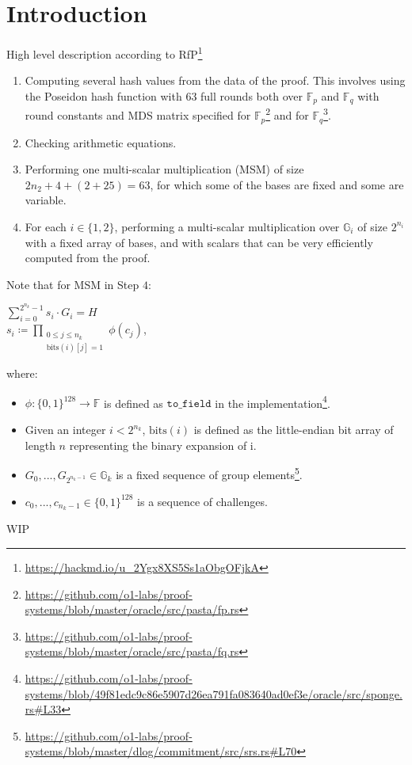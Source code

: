 \section{Introduction}
\label{section:introduction}

High level description according to RfP\footnote{\url{https://hackmd.io/u_2Ygx8XS5Ss1aObgOFjkA}}
\begin{enumerate}
	\item Computing several hash values from the data of the proof. 
This involves using the Poseidon hash function with 63 full rounds both over $\mathbb{F}_p$ and $\mathbb{F}_q$ 
with round constants and MDS matrix specified for $\mathbb{F}_p$\footnote{\url{https://github.com/o1-labs/proof-systems/blob/master/oracle/src/pasta/fp.rs}} 
and for $\mathbb{F}_q$\footnote{\url{https://github.com/o1-labs/proof-systems/blob/master/oracle/src/pasta/fq.rs}}.
	\item Checking arithmetic equations.
	\item Performing one multi-scalar multiplication (MSM) of size $2n_2 + 4 + (2 + 25) = 63$,
for which some of the bases are fixed and some are variable.
	\item For each $i \in \{1, 2\}$, performing a multi-scalar multiplication over $\mathbb{G}_i$ of size $2^{n_i}$
with a fixed array of bases, and with scalars that can be very efficiently computed from the proof.
\end{enumerate}

Note that for MSM in Step $4$:
\begin{center}
	$\sum\limits_{i = 0}^{2^{n_k} - 1}s_i \cdot G_i = H$ \\
	$s_i \coloneqq \prod\limits_{\substack{0 \leq j \leq n_k \\  \text{bits}(i)[j] = 1}} \phi(c_j)$,
\end{center}
where:
\begin{itemize}
	\item $\phi\colon \{0, 1\}^{128} \to \mathbb{F}$ is defined as $\texttt{to\_field}$ in the implementation\footnote{
\url{https://github.com/o1-labs/proof-systems/blob/49f81edc9c86e5907d26ea791fa083640ad0ef3e/oracle/src/sponge.rs\#L33}}.
	\item Given an integer $i < 2^{n_k}$, $\text{bits}(i)$ is defined as the little-endian bit array of length $n$ representing the binary expansion of i. 
	\item $G_0, ..., G_{2^{n_k - 1}} \in \mathbb{G}_k$ is a fixed sequence of group elements\footnote{
\url{https://github.com/o1-labs/proof-systems/blob/master/dlog/commitment/src/srs.rs\#L70}}.
	\item $c_0, ..., c_{n_k -1} \in \{0, 1\}^{128}$ is a sequence of challenges. 
\end{itemize}

WIP